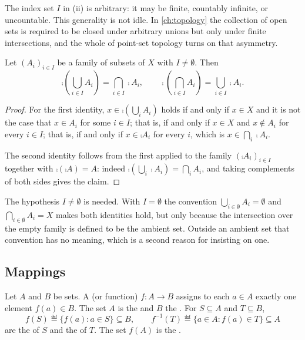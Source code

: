 The index set $I$ in (ii) is arbitrary: it may be finite, countably infinite, or
uncountable. This generality is not idle. In \autoref{ch:topology} the collection
of open sets is required to be closed under arbitrary unions but only under
finite intersections, and the whole of point-set topology turns on that
asymmetry.

\begin{proposition}\label{prop:demorgan}
	Let $(A_i)_{i\in I}$ be a family of subsets of $X$ with $I\neq\emptyset$. Then
	\[
		\comp{\left(\bigcup_{i\in I}A_i\right)}=\bigcap_{i\in I}\comp{A_i},
		\qquad
		\comp{\left(\bigcap_{i\in I}A_i\right)}=\bigcup_{i\in I}\comp{A_i}.
	\]
\end{proposition}

\begin{proof}
	For the first identity, $x\in\comp{\left(\bigcup_{i}A_i\right)}$ holds if and
	only if $x\in X$ and it is not the case that $x\in A_i$ for some $i\in I$; that
	is, if and only if $x\in X$ and $x\notin A_i$ for every $i\in I$; that is, if and
	only if $x\in\comp{A_i}$ for every $i$, which is $x\in\bigcap_i \comp{A_i}$.

	The second identity follows from the first applied to the family
	$(\comp{A_i})_{i\in I}$ together with $\comp{(\comp{A})}=A$: indeed
	$\comp{\left(\bigcup_i \comp{A_i}\right)}=\bigcap_i A_i$, and taking complements
	of both sides gives the claim.
\end{proof}

\begin{remark}
	The hypothesis $I\neq\emptyset$ is needed. With $I=\emptyset$ the convention
	$\bigcup_{i\in\emptyset}A_i=\emptyset$ and $\bigcap_{i\in\emptyset}A_i=X$ makes
	both identities hold, but only because the intersection over the empty family is
	defined to be the ambient set. Outside an ambient set that convention has no
	meaning, which is a second reason for insisting on one.
\end{remark}

\subsection{Mappings}

\begin{definition}[Mapping]\label{def:mapping}
	Let $A$ and $B$ be sets. A  (or function) $f\colon A\to B$ assigns
	to each $a\in A$ exactly one element $f(a)\in B$. The set $A$ is the
	 and $B$ the . For $S\subseteq A$ and
	$T\subseteq B$,
	\[
		f(S)\eqdef\{f(a) : a\in S\}\subseteq B,\qquad
		f^{-1}(T)\eqdef\{a\in A : f(a)\in T\}\subseteq A
	\]
	are the  of $S$ and the  of $T$. The set $f(A)$ is the
	.
\end{definition}

